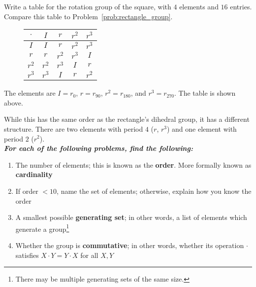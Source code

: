 \documentclass[../gatm_answers.tex]{subfiles}
\begin{document}
\begin{outer_problem}
\item Write a table for the rotation group of the square, with $4$ elements and $16$ entries. Compare this table to Problem~\ref{prob:rectangle_group}.
\end{outer_problem}

\begin{figure}[h]
	\begin{center}
		\begin{minipage}[b]{\textwidth}
			\centering
			\begin{tabular}{c|cccc}
				\hline
				$\cdot$ & $I$ & $r$ & $r^2$ & $r^3$ \\ \hline
				\rowcolor{light-gray}
				$I$ & $I$ & $r$ & $r^2$ & $r^3$ \\
				$r$ & $r$ & $r^2$ & $r^3$ & $I$ \\
				\rowcolor{light-gray}
				$r^2$ & $r^2$ & $r^3$ & $I$ & $r$ \\
				$r^3$ & $r^3$ & $I$ & $r$ & $r^2$ \\ \hline
			\end{tabular}
			\vspace*{0.5\baselineskip}
		\end{minipage}
	\end{center}
	\vspace*{-2\baselineskip}
\end{figure}%

\noindent The elements are $I=r_0$, $r=r_{90}$, $r^2=r_{180}$, and $r^3=r_{270}$. The table is shown above.

While this has the same order as the rectangle's dihedral group, it has a different structure. There are two elements with period $4$ ($r$, $r^3$) and one element with period $2$ ($r^2$).\\

\noindent\textbf{\textit{For each of the following problems, find the following:}}

\begin{enumerate}[label=(\alph*)]
\item The number of elements; this is known as the \textbf{order}. More formally known as \textbf{cardinality}
\item If order $< 10$, name the set of elements; otherwise, explain how you know the order
\item A smallest possible \textbf{generating set}; in other words, a list of elements which generate a group\footnote{There may be multiple generating sets of the same size.}
\item Whether the group is \textbf{commutative}; in other words, whether its operation $\cdot$ satisfies $X\cdot Y=Y\cdot X$ for all $X,Y$
\end{enumerate}
\end{document}
